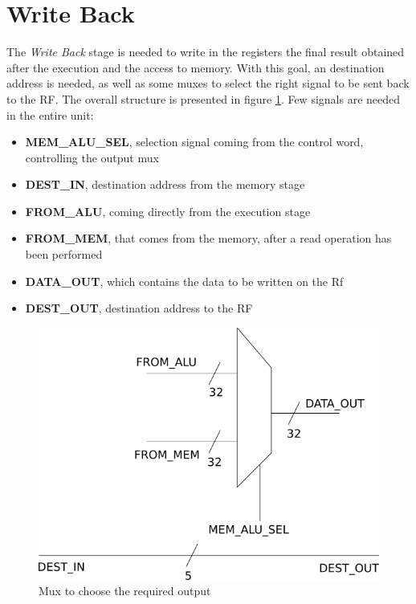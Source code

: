 \section{Write Back}
\label{chap_wb}


The \textit{Write Back} stage is needed to write in the registers the final result obtained after the execution and the access to memory. With this goal, an destination address is needed, as well as some muxes to select the right signal to be sent back to the \textsf{RF}. The overall structure is presented in figure \ref{wb_overall_fig}.
Few signals are needed in the entire unit:
\begin{itemize}
	\item \textbf{MEM\_ALU\_SEL}, selection signal coming from the control word, controlling the output mux
	\item \textbf{DEST\_IN}, destination address from the memory stage
	\item \textbf{FROM\_ALU}, coming directly from the execution stage
	\item \textbf{FROM\_MEM}, that comes from the memory, after a read operation has been performed
	\item \textbf{DATA\_OUT}, which contains the data to be written on the \textsf{Rf}
	\item \textbf{DEST\_OUT}, destination address to the \textsf{RF}
\end{itemize}

\begin{figure}
	\centering
	\includegraphics[scale=0.5]{chapters/figures/wb_stage}
	\caption{Mux to choose the required output}
	\label{wb_overall_fig}
\end{figure} 

